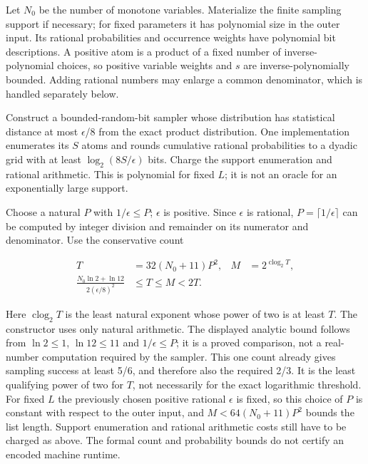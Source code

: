 Let \(N_0\) be the number of monotone variables. Materialize the finite sampling support if necessary; for fixed parameters it has polynomial size in the outer input. Its rational probabilities and occurrence weights have polynomial bit descriptions. A positive atom is a product of a fixed number of inverse-polynomial choices, so positive variable weights and \(s\) are inverse-polynomially bounded. Adding rational numbers may enlarge a common denominator, which is handled separately below.

Construct a bounded-random-bit sampler whose distribution has statistical distance at most \(\epsilon\)/8 from the exact product distribution. One implementation enumerates its \(S\) atoms and rounds cumulative rational probabilities to a dyadic grid with at least \(\log_2(8S/\epsilon)\) bits. Charge the support enumeration and rational arithmetic. This is polynomial for fixed \(L\); it is not an oracle for an exponentially large support.

Choose a natural \(P\) with \(1/\epsilon\le P\); \(\epsilon\) is positive. Since \(\epsilon\) is rational, \(P=\lceil 1/\epsilon\rceil\) can be computed by integer division and remainder on its numerator and denominator. Use the conservative count

\begin{equation}\label{eq:24}
\begin{aligned}T&=32(N_0+11)P^2, &M&=2^{\operatorname{clog}_2 T},\\\frac{N_0\ln2+\ln12}{2(\epsilon/8)^2}&\le T\le M<2T.\end{aligned}
\end{equation}

Here \(\operatorname{clog}_2 T\) is the least natural exponent whose power of two is at least \(T\). The constructor uses only natural arithmetic. The displayed analytic bound follows from \(\ln 2\le1\), \(\ln 12\le11\) and \(1/\epsilon\le P\); it is a proved comparison, not a real-number computation required by the sampler. This one count already gives sampling success at least 5/6, and therefore also the required 2/3. It is the least qualifying power of two for \(T\), not necessarily for the exact logarithmic threshold. For fixed \(L\) the previously chosen positive rational \(\epsilon\) is fixed, so this choice of \(P\) is constant with respect to the outer input, and \(M<64(N_0+11)P^2\) bounds the list length. Support enumeration and rational arithmetic costs still have to be charged as above. The formal count and probability bounds do not certify an encoded machine runtime.

